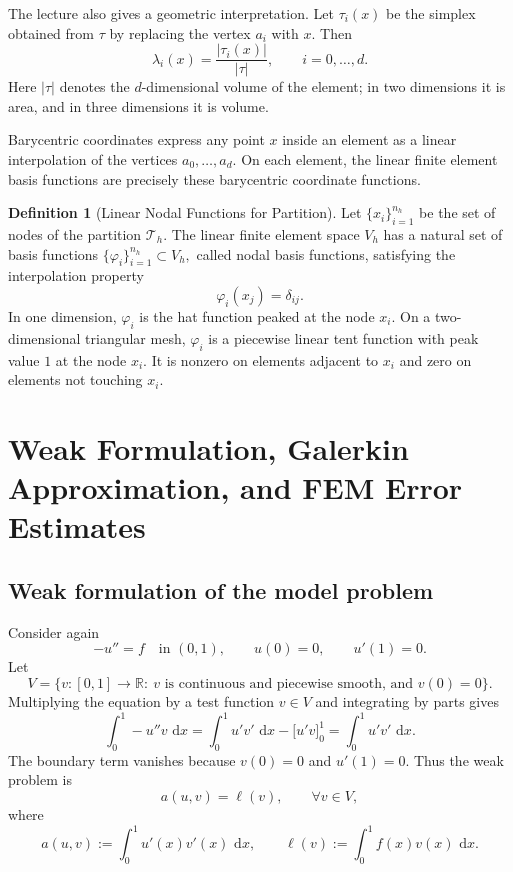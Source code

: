 \documentclass[11pt,a4paper]{article}
\newcommand{\R}{\mathbb{R}}
\newcommand{\dd}{\,\mathrm{d}}
\newcommand{\Th}{\mathcal{T}_h}
\newcommand{\Vh}{V_h}
\theoremstyle{definition}
\newtheorem{definition}{Definition}[section]
\theoremstyle{plain}
\theoremstyle{remark}
\theoremstyle{plain}
\newcommand{\boxnote}[1]{%
  \vspace{0.5em}
  \noindent\colorbox{softblue}{\parbox{0.965\linewidth}{#1}}
  \vspace{0.5em}
}
\begin{document}
The lecture also gives a geometric interpretation. Let $\tau_i(x)$ be the simplex obtained from $\tau$ by replacing the vertex $a_i$ with $x$. Then
\[
  \lambda_i(x)=\frac{|\tau_i(x)|}{|\tau|},
  \qquad i=0,\ldots,d.
\]
Here $|\tau|$ denotes the $d$-dimensional volume of the element; in two dimensions it is area, and in three dimensions it is volume.

\boxnote{Barycentric coordinates express any point $x$ inside an element as a linear interpolation of the vertices $a_0,\ldots,a_d$. On each element, the linear finite element basis functions are precisely these barycentric coordinate functions.}

\begin{definition}[Linear Nodal Functions for Partition]
Let
\(
  \{x_i\}_{i=1}^{n_h}
\)
be the set of nodes of the partition $\Th$. The linear finite element space $\Vh$ has a natural set of basis functions
\(
  \{\varphi_i\}_{i=1}^{n_h}\subset \Vh,
\)
called nodal basis functions, satisfying the interpolation property
\[
  \varphi_i(x_j)=\delta_{ij}.
\]
In one dimension, $\varphi_i$ is the hat function peaked at the node $x_i$. On a two-dimensional triangular mesh, $\varphi_i$ is a piecewise linear tent function with peak value $1$ at the node $x_i$. It is nonzero on elements adjacent to $x_i$ and zero on elements not touching $x_i$.
\end{definition}

\section{Weak Formulation, Galerkin Approximation, and FEM Error Estimates}

\subsection{Weak formulation of the model problem}
Consider again
\[
  -u''=f \quad \text{in }(0,1),
  \qquad
  u(0)=0,
  \qquad
  u'(1)=0.
\]
Let
\[
  V=\{v:[0,1]\to\R:\ v \text{ is continuous and piecewise smooth, and }v(0)=0\}.
\]
Multiplying the equation by a test function $v\in V$ and integrating by parts gives
\[
  \int_0^1-u''v\,\dd x
  =\int_0^1u'v'\,\dd x-\bigl[u'v\bigr]_0^1
  =\int_0^1u'v'\,\dd x.
\]
The boundary term vanishes because $v(0)=0$ and $u'(1)=0$. Thus the weak problem is
\[
  a(u,v)=\ell(v),\qquad \forall v\in V,
\]
where
\[
  a(u,v):=\int_0^1u'(x)v'(x)\,\dd x,
  \qquad
  \ell(v):=\int_0^1f(x)v(x)\,\dd x.
\]
\end{document}
